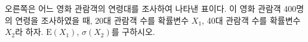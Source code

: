 \noindent\begin{minipage}[t]{0.58\linewidth}\vspace{0pt}\raggedright 오른쪽은 어느 영화 관람객의 연령대를 조사하여 나타낸 표이다. 이 영화 관람객 400명의 연령을 조사하였을 때, 20대 관람객 수를 확률변수 $X_1$, 40대 관람객 수를 확률변수 $X_2$라 하자. $\mathrm{E}(X_1)$, $\sigma(X_2)$를 구하시오.\end{minipage}\hfill\begin{minipage}[t]{0.4\linewidth}\vspace{0pt}\centering \resizebox{\ifdim\width>\linewidth\linewidth\else\width\fi}{!}{}\end{minipage}\par
